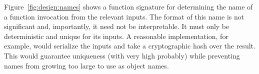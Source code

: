 Figure~\ref{fig:design:names} shows a function signature for determining the name of a
function invocation from the relevant inputs. The format of this name is not
significant and, importantly, it need not be interpretable. It must only be
deterministic and unique for its inputs. A reasonable implementation, for
example, would serialize the inputs and take a cryptographic hash over the
result. This would guarantee uniqueness (with very high probably) while
preventing names from growing too large to use as object names.
